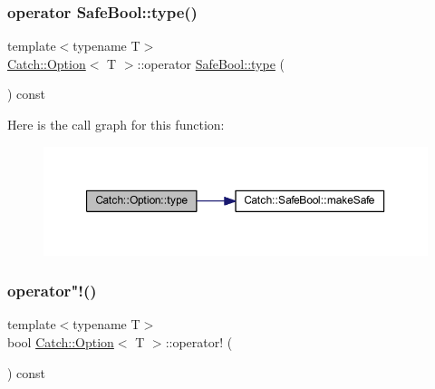 \hypertarget{class_catch_1_1_option_a8ed8de7b072f893c85df14913dbbe197}{}\label{class_catch_1_1_option_a8ed8de7b072f893c85df14913dbbe197} 
\subsubsection{\texorpdfstring{operator Safe\+Bool\+::type()}{operator SafeBool::type()}}
{\footnotesize\ttfamily template$<$typename T$>$ \\
\hyperlink{class_catch_1_1_option}{Catch\+::\+Option}$<$ T $>$\+::operator \hyperlink{class_catch_1_1_safe_bool_a39eef9baed296299d625a54d54a2a958}{Safe\+Bool\+::type} (\begin{DoxyParamCaption}{ }\end{DoxyParamCaption}) const\hspace{0.3cm}{\ttfamily [inline]}}

Here is the call graph for this function\+:\nopagebreak
\begin{figure}[H]
\begin{center}
\leavevmode
\includegraphics[width=350pt]{class_catch_1_1_option_a8ed8de7b072f893c85df14913dbbe197_cgraph}
\end{center}
\end{figure}
\hypertarget{class_catch_1_1_option_a96dccb86bdf45ee0c08e122b6133bef3}{}\label{class_catch_1_1_option_a96dccb86bdf45ee0c08e122b6133bef3} 
\subsubsection{\texorpdfstring{operator"!()}{operator!()}}
{\footnotesize\ttfamily template$<$typename T$>$ \\
bool \hyperlink{class_catch_1_1_option}{Catch\+::\+Option}$<$ T $>$\+::operator! (\begin{DoxyParamCaption}{ }\end{DoxyParamCaption}) const\hspace{0.3cm}{\ttfamily [inline]}}


